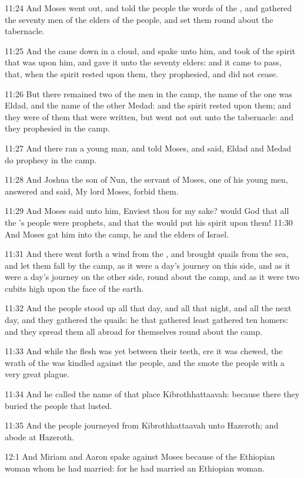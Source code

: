 11:24 And Moses went out, and told the people the words of the \LORD, and gathered the seventy men of the elders of the people, and set them round about the tabernacle.

11:25 And the \LORD came down in a cloud, and spake unto him, and took of the spirit that was upon him, and gave it unto the seventy elders: and it came to pass, that, when the spirit rested upon them, they prophesied, and did not cease.

11:26 But there remained two of the men in the camp, the name of the one was Eldad, and the name of the other Medad: and the spirit rested upon them; and they were of them that were written, but went not out unto the tabernacle: and they prophesied in the camp.

11:27 And there ran a young man, and told Moses, and said, Eldad and Medad do prophesy in the camp.

11:28 And Joshua the son of Nun, the servant of Moses, one of his young men, answered and said, My lord Moses, forbid them.

11:29 And Moses said unto him, Enviest thou for my sake? would God that all the \LORD's people were prophets, and that the \LORD would put his spirit upon them!  11:30 And Moses gat him into the camp, he and the elders of Israel.

11:31 And there went forth a wind from the \LORD, and brought quails from the sea, and let them fall by the camp, as it were a day's journey on this side, and as it were a day's journey on the other side, round about the camp, and as it were two cubits high upon the face of the earth.

11:32 And the people stood up all that day, and all that night, and all the next day, and they gathered the quails: he that gathered least gathered ten homers: and they spread them all abroad for themselves round about the camp.

11:33 And while the flesh was yet between their teeth, ere it was chewed, the wrath of the \LORD was kindled against the people, and the \LORD smote the people with a very great plague.

11:34 And he called the name of that place Kibrothhattaavah: because there they buried the people that lusted.

11:35 And the people journeyed from Kibrothhattaavah unto Hazeroth; and abode at Hazeroth.

12:1 And Miriam and Aaron spake against Moses because of the Ethiopian woman whom he had married: for he had married an Ethiopian woman.

